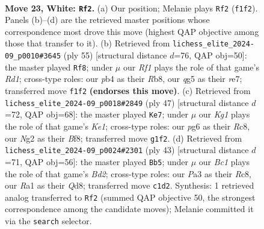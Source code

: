 \documentclass[11pt]{article}
\begin{document}
\clearpage

\begin{figure}[p]\centering
\begin{subfigure}{0.46\textwidth}\centering
\resizebox{\linewidth}{!}{%
\newchessgame
\chessboard[
  setfen={r6r/3nk2p/1ppbp1p1/6q1/1p1P4/P3P2P/1P4N1/R1BQ1RK1 w - - 0 23},
  showmover=false,
  pgfstyle=straightmove, color=movearrow, markmove={f1-f2}
]}
\caption{}
\end{subfigure}\hfill
\begin{subfigure}{0.46\textwidth}\centering
\resizebox{\linewidth}{!}{%
\newchessgame
\chessboard[
  setfen={1r1r2k1/4Rpq1/3p2p1/2pP1bNp/2P2Q2/1n4PP/5PB1/4R1K1 b - - 2 28},
  showmover=false,
  pgfstyle=straightmove, color=movearrow, markmove={d8-f8}
]}
\caption{}
\end{subfigure}
\\[4pt]
\begin{subfigure}{0.46\textwidth}\centering
\resizebox{\linewidth}{!}{%
\newchessgame
\chessboard[
  setfen={2r1kb1R/p2n2r1/q3p3/P5p1/1p1P1p2/3p1Q2/1P1N1PPB/3RK3 b - - 1 24},
  showmover=false,
  pgfstyle=straightmove, color=movearrow, markmove={e8-e7}
]}
\caption{}
\end{subfigure}\hfill
\begin{subfigure}{0.46\textwidth}\centering
\resizebox{\linewidth}{!}{%
\newchessgame
\chessboard[
  setfen={2rq1rk1/3b1pp1/p3p2p/3p4/1P1P4/3B1Q2/P4PPP/2R1R1K1 b - - 0 22},
  showmover=false,
  pgfstyle=straightmove, color=movearrow, markmove={d7-b5}
]}
\caption{}
\end{subfigure}
\caption{\textbf{Move 23, White: \texttt{Rf2}.} (a) Our position; Melanie plays \texttt{Rf2} (\texttt{f1f2}). Panels (b)--(d) are the retrieved master positions whose correspondence most drove this move (highest QAP objective among those that transfer to it). (b) Retrieved from \texttt{lichess\_elite\_2024-09\_p0010\#3645} (ply 55) [structural distance $d$=76, QAP obj=50]: the master played \texttt{Rf8}; under $\mu$ our \emph{Rf1} plays the role of that game's \emph{Rd1}; cross-type roles: our \emph{p}b4 as their \emph{R}b8, our \emph{q}g5 as their \emph{r}e7; transferred move \texttt{f1f2} \textbf{(endorses this move)}. (c) Retrieved from \texttt{lichess\_elite\_2024-09\_p0018\#2849} (ply 47) [structural distance $d$=72, QAP obj=68]: the master played \texttt{Ke7}; under $\mu$ our \emph{Kg1} plays the role of that game's \emph{Ke1}; cross-type roles: our \emph{p}g6 as their \emph{R}c8, our \emph{N}g2 as their \emph{B}f8; transferred move \texttt{g1f2}. (d) Retrieved from \texttt{lichess\_elite\_2024-09\_p0024\#2301} (ply 43) [structural distance $d$=71, QAP obj=56]: the master played \texttt{Bb5}; under $\mu$ our \emph{Bc1} plays the role of that game's \emph{Bd2}; cross-type roles: our \emph{P}a3 as their \emph{R}c8, our \emph{R}a1 as their \emph{Q}d8; transferred move \texttt{c1d2}. Synthesis: 1 retrieved analog transferred to \texttt{Rf2} (summed QAP objective 50, the strongest correspondence among the candidate moves); Melanie committed it via the \texttt{search} selector.}
\label{fig:thought-m44}
\end{figure}
\end{document}

